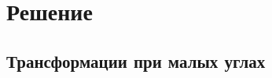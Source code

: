 \documentclass{beamer}
\begin{document}


\section{Решение}
\subsection{Трансформации при малых углах}
\end{document}
